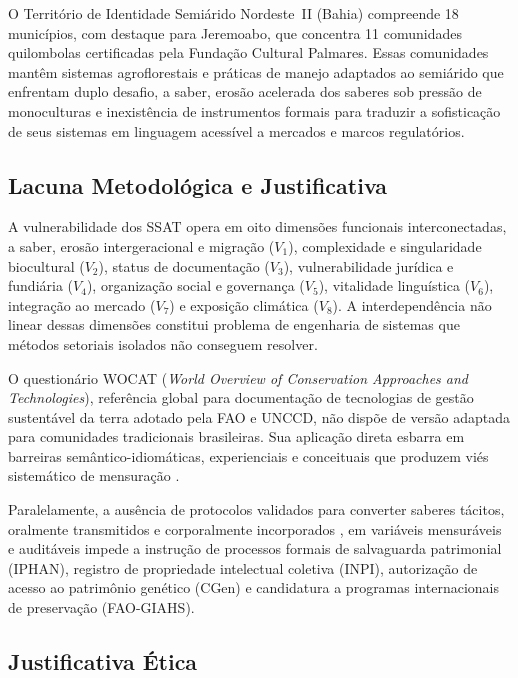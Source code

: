 \documentclass[12pt,a4paper,brazil]{article}
\begin{document}
O Território de Identidade Semiárido Nordeste~II (Bahia) compreende 18 municípios, com destaque para Jeremoabo, que concentra 11 comunidades quilombolas certificadas pela Fundação Cultural Palmares. Essas comunidades mantêm sistemas agroflorestais e práticas de manejo adaptados ao semiárido que enfrentam duplo desafio, a saber, erosão acelerada dos saberes sob pressão de monoculturas e inexistência de instrumentos formais para traduzir a sofisticação de seus sistemas em linguagem acessível a mercados e marcos regulatórios.

\subsection{Lacuna Metodológica e Justificativa}

A vulnerabilidade dos SSAT opera em oito dimensões funcionais interconectadas, a saber, erosão intergeracional e migração ($V_1$), complexidade e singularidade biocultural ($V_2$), status de documentação ($V_3$), vulnerabilidade jurídica e fundiária ($V_4$), organização social e governança ($V_5$), vitalidade linguística ($V_6$), integração ao mercado ($V_7$) e exposição climática ($V_8$). A interdependência não linear dessas dimensões constitui problema de engenharia de sistemas que métodos setoriais isolados não conseguem resolver.

O questionário WOCAT (\textit{World Overview of Conservation Approaches and Technologies}), referência global para documentação de tecnologias de gestão sustentável da terra adotado pela FAO e UNCCD, não dispõe de versão adaptada para comunidades tradicionais brasileiras. Sua aplicação direta esbarra em barreiras semântico-idiomáticas, experienciais e conceituais que produzem viés sistemático de mensuração \citep{Herdman1999,Guillemin1993}.

Paralelamente, a ausência de protocolos validados para converter saberes tácitos, oralmente transmitidos e corporalmente incorporados \citep{Polanyi1966}, em variáveis mensuráveis e auditáveis impede a instrução de processos formais de salvaguarda patrimonial (IPHAN), registro de propriedade intelectual coletiva (INPI), autorização de acesso ao patrimônio genético (CGen) e candidatura a programas internacionais de preservação (FAO-GIAHS).

\subsection{Justificativa Ética}
\end{document}
